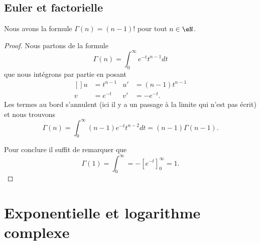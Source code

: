 \subsection{Euler et factorielle}

\begin{proposition}
    Nous avons la formule \( \Gamma(n)=(n-1)!\) pour tout \( n\in \eN\).
\end{proposition}

\begin{proof}
    Nous partons de la formule
    \begin{equation}
        \Gamma(n)=\int_0^{\infty} e^{-t}t^{n-1}dt
    \end{equation}
    que nous intégrons par partie en posant
    \begin{equation}
        \begin{aligned}[]
            u&=t^{n-1}&u'&=(n-1)t^{n-1}\\
            v&= e^{-t}&v'&=- e^{-t}.
        \end{aligned}
    \end{equation}
    Les termes au bord s'annulent (ici il y a un passage à la limite qui n'est pas écrit) et nous trouvons
    \begin{equation}
        \Gamma(n)=\int_0^{\infty}(n-1) e^{-t}t^{n-2}dt=(n-1)\Gamma(n-1).
    \end{equation}

    Pour conclure il suffit de remarquer que
    \begin{equation}
        \Gamma(1)=\int_0^{\infty}=-[ e^{-t}]_0^{\infty}=1.
    \end{equation}
\end{proof}

\section{Exponentielle et logarithme complexe}

